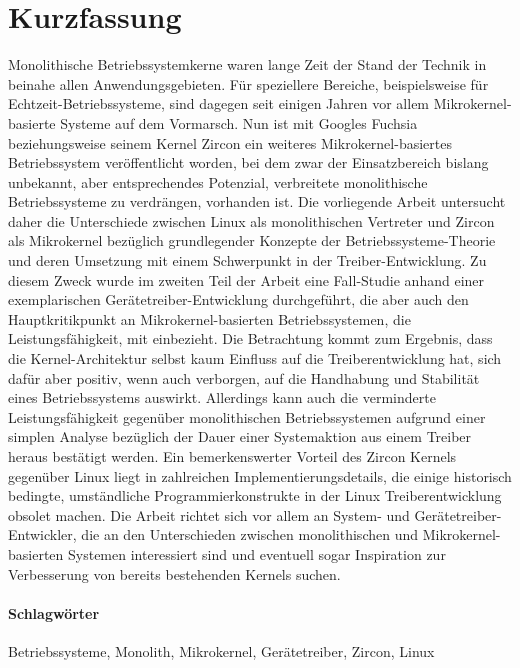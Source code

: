 
\section*{Kurzfassung}
Monolithische Betriebssystemkerne waren lange Zeit der Stand der Technik in beinahe allen Anwendungsgebieten.
Für speziellere Bereiche, beispielsweise für Echtzeit-Betriebssysteme, sind dagegen seit einigen Jahren vor allem Mikrokernel-basierte Systeme auf dem Vormarsch.
Nun ist mit Googles Fuchsia beziehungsweise seinem Kernel Zircon ein weiteres Mikrokernel-basiertes Betriebssystem veröffentlicht worden, bei dem zwar der Einsatzbereich bislang unbekannt, aber entsprechendes Potenzial, verbreitete monolithische Betriebssysteme zu verdrängen, vorhanden ist.
Die vorliegende Arbeit untersucht daher die Unterschiede zwischen Linux als monolithischen Vertreter und Zircon als Mikrokernel bezüglich grundlegender Konzepte der Betriebssysteme-Theorie und deren Umsetzung mit einem Schwerpunkt in der Treiber-Entwicklung.
Zu diesem Zweck wurde im zweiten Teil der Arbeit eine Fall-Studie anhand einer exemplarischen Gerätetreiber-Entwicklung durchgeführt, die aber auch den Hauptkritikpunkt an Mikrokernel-basierten Betriebssystemen, die Leistungsfähigkeit, mit einbezieht.
Die Betrachtung kommt zum Ergebnis, dass die Kernel-Architektur selbst kaum Einfluss auf die Treiberentwicklung hat, sich dafür aber positiv, wenn auch verborgen, auf die Handhabung und Stabilität eines Betriebssystems auswirkt.
Allerdings kann auch die verminderte Leistungsfähigkeit gegenüber monolithischen Betriebssystemen aufgrund einer simplen Analyse bezüglich der Dauer einer Systemaktion aus einem Treiber heraus bestätigt werden.
Ein bemerkenswerter Vorteil des Zircon Kernels gegenüber Linux liegt in zahlreichen Implementierungsdetails, die einige historisch bedingte, umständliche Programmierkonstrukte in der Linux Treiberentwicklung obsolet machen.
Die Arbeit richtet sich vor allem an System- und Gerätetreiber-Entwickler, die an den Unterschieden zwischen monolithischen und Mikrokernel-basierten Systemen interessiert sind und eventuell sogar Inspiration zur Verbesserung von bereits bestehenden Kernels suchen.

\paragraph{Schlagwörter} Betriebssysteme, Monolith, Mikrokernel, Gerätetreiber, Zircon, Linux 

\newpage
